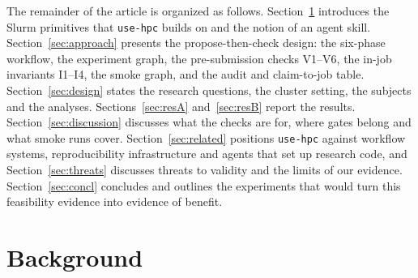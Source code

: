 \documentclass[pdflatex,sn-mathphys-num]{sn-jnl}
\theoremstyle{thmstyletwo}%
\theoremstyle{thmstylethree}%
\newcommand{\tool}{\texttt{use-hpc}}
\newcommand{\V}[1]{\textsf{V#1}}
\newcommand{\I}[1]{\textsf{I#1}}
\begin{document}
The remainder of the article is organized as follows. Section~\ref{sec:background} introduces the Slurm primitives that \tool{} builds on and the notion of an agent skill. Section~\ref{sec:approach} presents the propose-then-check design: the six-phase workflow, the experiment graph, the pre-submission checks \V{1}--\V{6}, the in-job invariants \I{1}--\I{4}, the smoke graph, and the audit and claim-to-job table.  Section~\ref{sec:design} states the research questions, the cluster setting, the subjects and the analyses. Sections~\ref{sec:resA} and~\ref{sec:resB} report the results. Section~\ref{sec:discussion} discusses what the checks are for, where gates belong and what smoke runs cover. Section~\ref{sec:related} positions \tool{} against workflow systems, reproducibility infrastructure and agents that set up research code, and Section~\ref{sec:threats} discusses threats to validity and the limits of our evidence. Section~\ref{sec:concl} concludes and outlines the experiments that would turn this feasibility evidence into evidence of benefit.


\section{Background}\label{sec:background}
\end{document}
